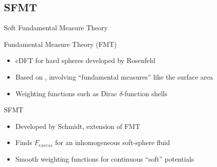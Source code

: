 \documentclass{beamer}
\begin{document}

\subsection*{SFMT}
\begin{frame}{Soft Fundamental Measure Theory}
  \begin{block}{Fundamental Measure Theory (FMT)} 
       \begin{itemize}
           \item cDFT for hard spheres developed by Rosenfeld
           \item Based on , involving
                 ``fundamental measures'' like the surface area
           \item Weighting functions such as Dirac $\delta$-function shells
       \end{itemize}
  \end{block} 
  \begin{block}{SFMT}
     \begin{itemize}            
           \item Developed by Schmidt, extension of FMT 
           \item Finds $F_{excess}$ for an inhomogeneous soft-sphere fluid
           \item Smooth weighting functions for
                continuous ``soft'' potentials
     \end{itemize}
  \end{block}  
\end{frame}
\end{document}
